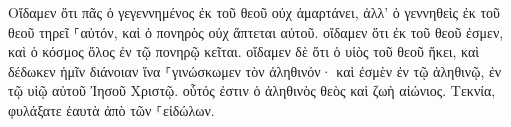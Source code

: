 \documentclass{openreader}
\begin{document}
Οἴδαμεν ὅτι πᾶς ὁ γεγεννημένος ἐκ τοῦ θεοῦ οὐχ ἁμαρτάνει, ἀλλ’ ὁ γεννηθεὶς ἐκ τοῦ θεοῦ τηρεῖ ⸀αὐτόν, καὶ ὁ πονηρὸς οὐχ ἅπτεται αὐτοῦ. 
οἴδαμεν ὅτι ἐκ τοῦ θεοῦ ἐσμεν, καὶ ὁ κόσμος ὅλος ἐν τῷ πονηρῷ κεῖται. 
οἴδαμεν δὲ ὅτι ὁ υἱὸς τοῦ θεοῦ ἥκει, καὶ δέδωκεν ἡμῖν διάνοιαν ἵνα ⸀γινώσκωμεν τὸν ἀληθινόν· καὶ ἐσμὲν ἐν τῷ ἀληθινῷ, ἐν τῷ υἱῷ αὐτοῦ Ἰησοῦ Χριστῷ. οὗτός ἐστιν ὁ ἀληθινὸς θεὸς καὶ ζωὴ αἰώνιος. 
Τεκνία, φυλάξατε ἑαυτὰ ἀπὸ τῶν ⸀εἰδώλων. 
\end{document}
